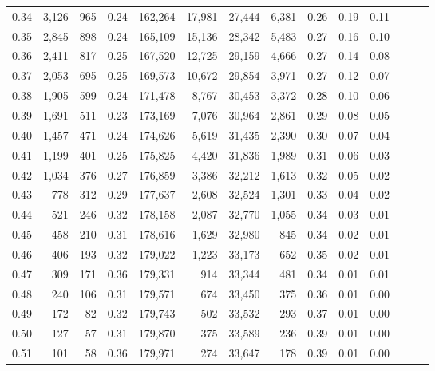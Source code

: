\begin{tabular}{rrrrrrrrrrrrrr}
0.34 &   3,126 &    965 &  0.24 &  162,264 &   17,981 &  27,444 &   6,381 &  0.26 &  0.19 &      0.11 \\
0.35 &   2,845 &    898 &  0.24 &  165,109 &   15,136 &  28,342 &   5,483 &  0.27 &  0.16 &      0.10 \\
0.36 &   2,411 &    817 &  0.25 &  167,520 &   12,725 &  29,159 &   4,666 &  0.27 &  0.14 &      0.08 \\
0.37 &   2,053 &    695 &  0.25 &  169,573 &   10,672 &  29,854 &   3,971 &  0.27 &  0.12 &      0.07 \\
0.38 &   1,905 &    599 &  0.24 &  171,478 &    8,767 &  30,453 &   3,372 &  0.28 &  0.10 &      0.06 \\
0.39 &   1,691 &    511 &  0.23 &  173,169 &    7,076 &  30,964 &   2,861 &  0.29 &  0.08 &      0.05 \\
0.40 &   1,457 &    471 &  0.24 &  174,626 &    5,619 &  31,435 &   2,390 &  0.30 &  0.07 &      0.04 \\
0.41 &   1,199 &    401 &  0.25 &  175,825 &    4,420 &  31,836 &   1,989 &  0.31 &  0.06 &      0.03 \\
0.42 &   1,034 &    376 &  0.27 &  176,859 &    3,386 &  32,212 &   1,613 &  0.32 &  0.05 &      0.02 \\
0.43 &     778 &    312 &  0.29 &  177,637 &    2,608 &  32,524 &   1,301 &  0.33 &  0.04 &      0.02 \\
0.44 &     521 &    246 &  0.32 &  178,158 &    2,087 &  32,770 &   1,055 &  0.34 &  0.03 &      0.01 \\
0.45 &     458 &    210 &  0.31 &  178,616 &    1,629 &  32,980 &     845 &  0.34 &  0.02 &      0.01 \\
0.46 &     406 &    193 &  0.32 &  179,022 &    1,223 &  33,173 &     652 &  0.35 &  0.02 &      0.01 \\
0.47 &     309 &    171 &  0.36 &  179,331 &      914 &  33,344 &     481 &  0.34 &  0.01 &      0.01 \\
0.48 &     240 &    106 &  0.31 &  179,571 &      674 &  33,450 &     375 &  0.36 &  0.01 &      0.00 \\
0.49 &     172 &     82 &  0.32 &  179,743 &      502 &  33,532 &     293 &  0.37 &  0.01 &      0.00 \\
0.50 &     127 &     57 &  0.31 &  179,870 &      375 &  33,589 &     236 &  0.39 &  0.01 &      0.00 \\
0.51 &     101 &     58 &  0.36 &  179,971 &      274 &  33,647 &     178 &  0.39 &  0.01 &      0.00 \\

\end{tabular}
